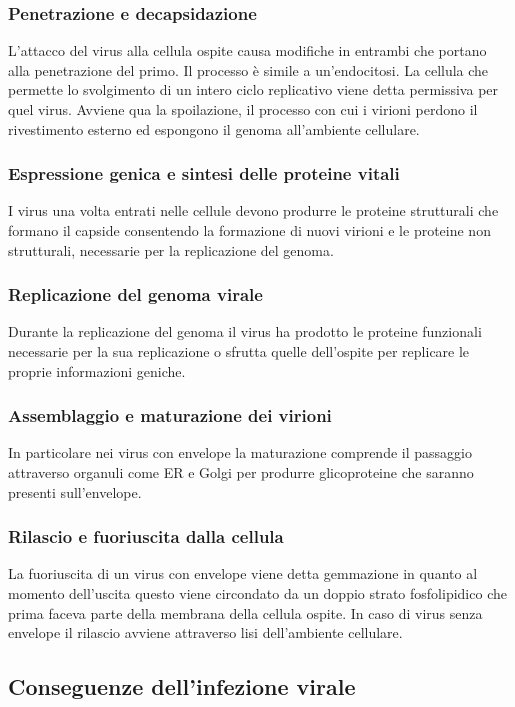 		\subsubsection{Penetrazione e decapsidazione}
		L'attacco del virus alla cellula ospite causa modifiche in entrambi che portano alla penetrazione del primo.
		Il processo \`e simile a un'endocitosi.
		La cellula che permette lo svolgimento di un intero ciclo replicativo viene detta permissiva per quel virus.
		Avviene qua la spoilazione, il processo con cui i virioni perdono il rivestimento esterno ed espongono il genoma all'ambiente cellulare.

		\subsubsection{Espressione genica e sintesi delle proteine vitali}
		I virus una volta entrati nelle cellule devono produrre le proteine strutturali che formano il capside consentendo la formazione di nuovi virioni e le proteine non strutturali, necessarie per la replicazione del genoma.

		\subsubsection{Replicazione del genoma virale}
		Durante la replicazione del genoma il virus ha prodotto le proteine funzionali necessarie per la sua replicazione o sfrutta quelle dell'ospite per replicare le proprie informazioni geniche.

		\subsubsection{Assemblaggio e maturazione dei virioni}
		In particolare nei virus con envelope la maturazione comprende il passaggio attraverso organuli come ER e Golgi per produrre glicoproteine che saranno presenti sull'envelope.

		\subsubsection{Rilascio e fuoriuscita dalla cellula}
		La fuoriuscita di un virus con envelope viene detta gemmazione in quanto al momento dell'uscita questo viene circondato da un doppio strato fosfolipidico che prima faceva parte della membrana della cellula ospite.
		In caso di virus senza envelope il rilascio avviene attraverso lisi dell'ambiente cellulare.

	\subsection{Conseguenze dell'infezione virale}

